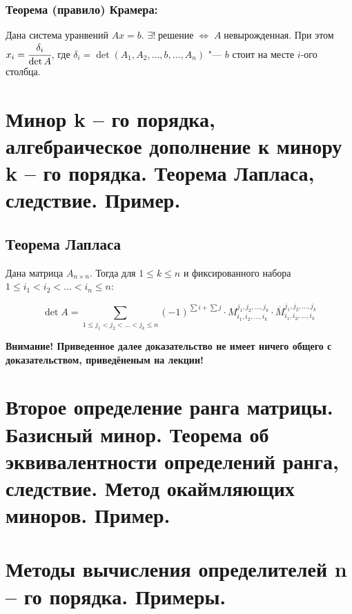 \documentclass{article}
\begin{document}
\subsubsection{Теорема (правило) Крамера:}
Дана система уранвений $Ax = b$. 
$\exists ! \;\text{решение} \;\Leftrightarrow\; A\;\text{невырожденная}$.
При  этом $x_i = \cfrac{\delta_i}{\operatorname{det}A}$, где $\delta_i = \operatorname{det}(A_1, A_2, \ldots, b, \ldots, A_n)$ "--- $b$ стоит на месте $i$-ого столбца.

\newpage
\section{Минор k – го порядка, алгебраическое дополнение к минору k – го порядка. Теорема Лапласа, следствие. Пример.}

\subsection{Теорема Лапласа}

Дана матрица $A_{n\times n}$. Тогда для $1 \leq k \leq n$ и фиксированного набора $1 \leq i_1 < i_2 <\ldots < i_n \leq n$: 

$$\operatorname{det}A = \sum_{1 \leq j_1 < j_2 <\ldots < j_k \leq n} (-1)^{\sum i + \sum j}\cdot M^{j_1, j_2, \ldots, j_k}_{i_1, i_2, \ldots, i_k} \cdot \overline{M}^{j_1, j_2, \ldots, j_k}_{i_1, i_2, \ldots, i_k}$$

\textbf{Внимание! Приведенное далее доказательство не имеет ничего общего с доказательством, приведёненым на лекции!}

\newpage
\section{Второе определение ранга матрицы. Базисный минор. Теорема об эквивалентности определений ранга, следствие. Метод окаймляющих миноров. Пример.}

\newpage
\section{Методы вычисления определителей n – го порядка. Примеры.}


 
\end{document}
